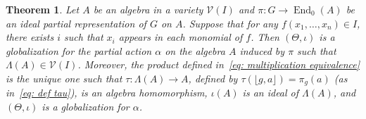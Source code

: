 \documentclass[11pt]{amsart}
\numberwithin{equation}{section}
\newtheorem{theorem}{Theorem}[section] %
\theoremstyle{definition}
\theoremstyle{remark}
\begin{document}
\begin{theorem}\label{t: globalization on varieties}
    Let $A$ be an algebra in a variety $\mathcal{V}(I)$ and $\pi: G \to \operatorname{End}_0(A)$ be   an ideal partial representation of $G$ on \(A\).
    Suppose that for any $f(x_1, \ldots, x_n) \in I$, there exists \(i\) such that \(x_i\) appears in each monomial of $f$. Then $(\Theta, \iota)$ is a globalization for the partial action $\alpha$  on the algebra $A$ induced by $\pi$ such that \(\Lambda(A) \in \mathcal{V}(I)\).
    Moreover, the product defined in~\eqref{eq: multiplication equivalence} is the unique one such that $\tau: \Lambda(A) \to A$, defined by $\tau(\lfloor g, a \rfloor) = \pi_g(a)$ (as in~\eqref{eq: def tau}), is an algebra homomorphism, $\iota(A)$ is an ideal of $\Lambda(A)$, and $(\Theta, \iota)$ is a globalization for $\alpha$.
\end{theorem}
\end{document}
